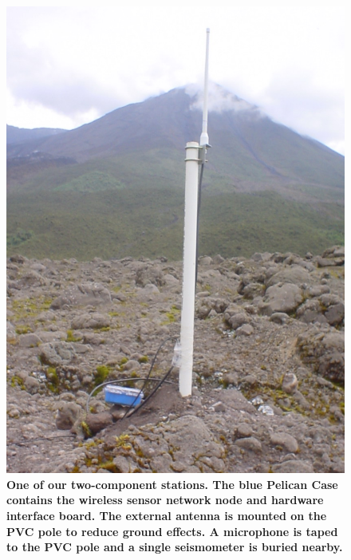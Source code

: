 \begin{figure}[t]
\begin{center}
\includegraphics[width=0.7\hsize]{./figures/Node-212-5}
\end{center}
\caption{\small {\bf {One of our two-component stations.  The blue Pelican
Case contains the wireless sensor network node and hardware interface board.
The external antenna is mounted on the PVC pole to reduce ground effects.
A microphone is taped to the PVC pole and a single seismometer is buried
nearby.}}}
\label{fig-station2}
\end{figure}


